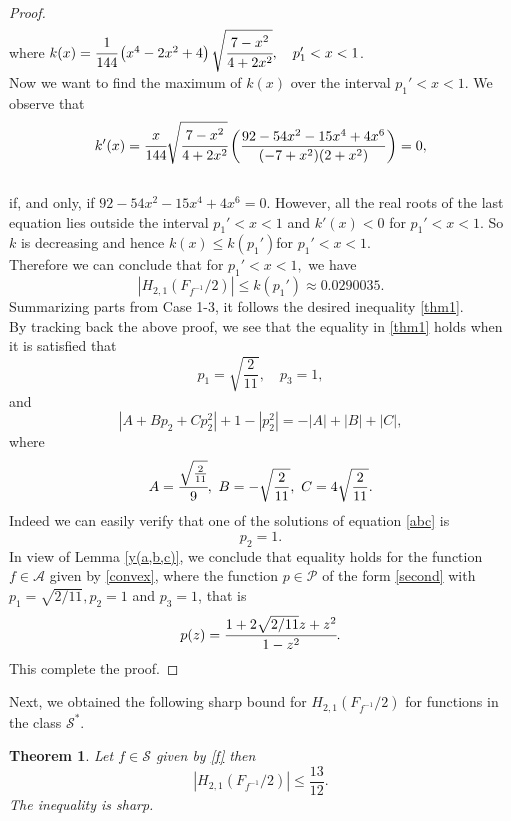 \documentclass[a4paper,12pt]{amsart}
\newtheorem{theorem}{Theorem}[section]
\theoremstyle{definition}
\numberwithin{equation}{section}
\begin{document}
\begin{proof}
\begin{equation}
\begin{aligned}
\end{aligned}
\end{equation}
where $k(x)=\cfrac{1}{144}\left(x^4-2x^2+4\right)\sqrt{\cfrac{7-x^2}{4+2x^2}}, \quad p_1'<x<1$.\\[2mm]
Now we want to find the maximum of $k(x)$ over the interval $p_1'<x<1$. We observe that
$$
k'(x)=\cfrac{x}{144}  \sqrt{\cfrac{7 - x^2}{
 4 + 2 x^2}}\left( \frac{92 - 54x^2 - 15 x^4 + 4 x^6}{(-7 + x^2) (2 +
    x^2)}\right)=0,
$$\\[1mm]
    if, and only, if $92 - 54x^2 - 15 x^4 + 4 x^6=0$. However, all the real roots of the last equation lies outside the interval $p_1'<x<1$ and $k'(x)<0$ for $p_1'<x<1$. So $k$ is decreasing and hence $k(x)\leq k(p_1')$for $p_1'<x<1$.\\[1mm]
Therefore we can conclude that for $p_1'<x<1,$
we have
$$
 |H_{2,1}(F_{f^{-1}}/2)|\leq k(p_1') \approx 0.0290035.
$$
Summarizing parts from Case 1-3, it follows the desired inequality \eqref{thm1}.\\
By tracking back the above proof, we see that the equality in \eqref{thm1} holds when it is satisfied that 
\begin{equation}
p_1=\sqrt{\frac{2}{11}},\quad p_3=1,
\end{equation}
and
\begin{equation}\label{abc}
|A+Bp_2+Cp_2^2|+1-|p_2^2|=-|A|+|B|+|C|,
\end{equation}
where
$$
A=\cfrac{\sqrt{\frac{2}{11}}}{9},\,\, B=-\sqrt{\frac{2}{11}},\,\,C=4\sqrt{\frac{2}{11}}.
$$
Indeed we can easily verify that one of the solutions of equation \eqref{abc} is
$$
p_2=1.
$$
In view of Lemma \ref{y(a,b,c)}, we conclude that equality holds for the function $f\in \mathcal{A}$ given by \eqref{convex}, where the function $p \in \mathcal{P}$ of the form \eqref{second} with $p_1=\sqrt{2/11},p_2=1$ and $p_3=1$, that is 
$$
p(z)=\cfrac{1+2\sqrt{2/11}z+z^2}{1-z^2}.
$$
This complete the proof.
\end{proof}
Next, we obtained the following sharp bound for $H_{2,1}(F_{f^{-1}}/2)$ for functions in the class $\mathcal{S}^*$.
\begin{theorem}
Let $f\in\mathcal{S}$ given by \eqref{f} then
\begin{equation}\label{thm2}
	|H_{2,1}(F_{f^{-1}}/2)| \leq \frac{13}{12}.
\end{equation}
	The inequality is sharp.

\end{theorem}
\end{document}
